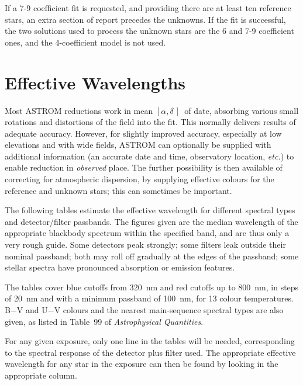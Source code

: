 \documentclass[twoside,11pt]{article}
\newcommand{\xlabel}[1]{}
\renewcommand{\_}{\texttt{\symbol{95}}}
\newcommand{\radec}     {$[\alpha,\delta\,]$}
\begin{document}
If a 7-9 coefficient fit is requested, and providing there are at
least ten reference stars, an extra section of report precedes the
unknowns.  If the fit is successful, the two solutions used to process
the unknown stars are the 6 and 7-9 coefficient ones, and the
4-coefficient model is not used.

\newpage
\section{\xlabel{effective_wavelengths}Effective Wavelengths}
\label{effective_wavelengths}

Most ASTROM reductions work in mean \radec\ of date, absorbing
various small rotations and distortions of the field into the
fit.  This normally delivers results of adequate accuracy.
However, for slightly improved accuracy, especially at low
elevations and with wide fields, ASTROM can optionally be supplied with
additional information (an accurate date and time,
observatory location, \textit{etc.}) to enable reduction in
\textit{observed} place.  The further possibility is then
available of correcting for atmospheric dispersion, by
supplying effective colours for the reference and unknown stars;
this can sometimes be important.

The following tables estimate the effective wavelength for different
spectral types and detector/filter passbands.  The figures given are the
median wavelength of the appropriate blackbody spectrum within the
specified band, and are thus only a very rough guide.  Some detectors
peak strongly; some filters leak outside their nominal
passband; both may roll off gradually at the edges of the passband;
some stellar spectra have pronounced absorption or emission
features.

The tables cover blue cutoffs from 320~nm and red cutoffs up to 800~nm,
in steps of 20~nm and with a minimum passband of 100~nm, for 13
colour temperatures.  B$-$V and U$-$V colours and
the nearest main-sequence spectral types are also given, as listed
in Table~99 of \textit{Astrophysical Quantities}.

For any given exposure, only one line in the tables will be
needed, corresponding to the spectral response of the detector plus
filter used.  The appropriate effective wavelength for any star in
the exposure can then be found by looking in the appropriate
column.

\clearpage

\end{document}
